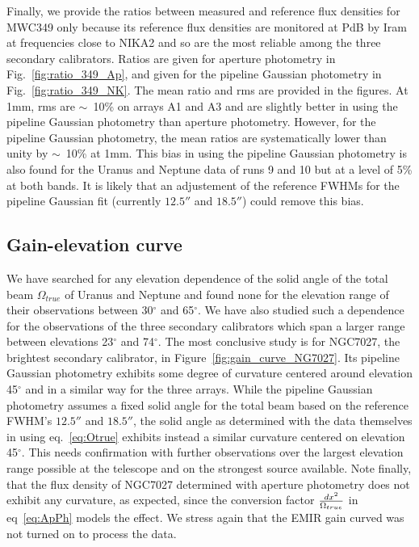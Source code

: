Finally, we provide the ratios between measured and reference flux densities for MWC349 only because
its reference flux densities are monitored at PdB
       by Iram at frequencies close to NIKA2 and so are the most reliable among the three secondary calibrators.
       Ratios are given for aperture photometry in Fig.~\ref{fig:ratio_349_Ap}, and  given for
       the pipeline Gaussian photometry in Fig.~\ref{fig:ratio_349_NK}.
       The mean ratio and rms are provided in the figures. At 1mm, rms  are $\sim$~10\% on arrays A1 and A3 
       and are slightly better
       in using the pipeline Gaussian photometry than aperture photometry.
       However, for the  pipeline Gaussian photometry, the mean ratios are systematically lower than unity by $\sim$~10\% at 1mm.
        This bias in using the pipeline Gaussian photometry
       is also found for the Uranus and Neptune data of runs 9 and 10 but at a level of 5\% at both bands. It is likely that an adjustement
       of the reference FWHMs for the pipeline Gaussian fit (currently $12.5''$ and $18.5''$) could remove this bias.


\subsection{Gain-elevation curve}


We have searched for any elevation dependence of the solid angle of the total beam  $\Omega_{true}$ of Uranus and Neptune
and found none for
the elevation range of their observations between  30$^{\circ}$ and 65$^{\circ}$.  We have also studied such a dependence
for the observations of the three secondary calibrators which span a larger range between elevations 23$^{\circ}$ and 74$^{\circ}$.
The most conclusive study is for NGC7027, the brightest secondary calibrator, in Figure~\ref{fig:gain_curve_NG7027}. 
Its pipeline Gaussian photometry exhibits some degree of curvature centered around elevation 45$^{\circ}$ and in a similar way
for the three arrays.
While the pipeline Gaussian photometry  assumes a fixed solid angle for the total beam based on the reference FWHM's $12.5''$ and $18.5''$,
the solid angle as determined with the data themselves in using
eq.~\ref{eq:Otrue} exhibits instead a similar curvature centered on elevation 45$^{\circ}$. This needs confirmation with further
observations  over the largest elevation range possible at the telescope and on the strongest source available. Note finally,
that the flux density of NGC7027 determined
with aperture photometry does not exhibit any curvature, as expected, since the conversion factor ${dx^2} \over {\Omega_{true}}$
in eq~\ref{eq:ApPh} models the effect.  We stress again that the EMIR gain curved was not turned on to process the data. 





